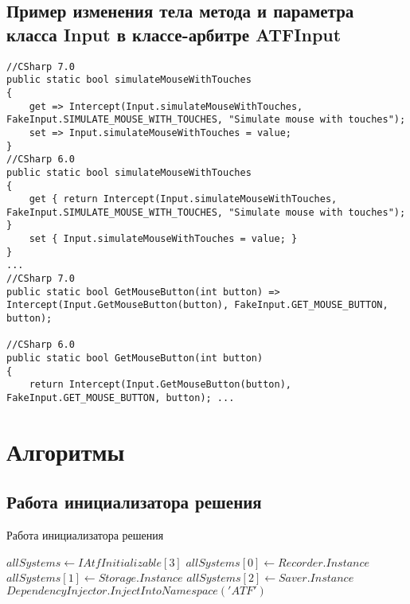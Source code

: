 \section{Пример изменения тела метода и параметра класса Input в классе-арбитре ATFInput}
\begin{lstlisting}[caption={Пример изменения тела метода и параметра класса Input в классе-арбитре ATFInput},label=atf_methods_refactor_example]
//CSharp 7.0
public static bool simulateMouseWithTouches
{
	get => Intercept(Input.simulateMouseWithTouches, 	FakeInput.SIMULATE_MOUSE_WITH_TOUCHES, "Simulate mouse with touches");
	set => Input.simulateMouseWithTouches = value;
}
//CSharp 6.0
public static bool simulateMouseWithTouches
{
	get { return Intercept(Input.simulateMouseWithTouches, 	FakeInput.SIMULATE_MOUSE_WITH_TOUCHES, "Simulate mouse with touches"); }
	set { Input.simulateMouseWithTouches = value; }
}
...
//CSharp 7.0
public static bool GetMouseButton(int button) => Intercept(Input.GetMouseButton(button), FakeInput.GET_MOUSE_BUTTON, button);

//CSharp 6.0
public static bool GetMouseButton(int button)
{
	return Intercept(Input.GetMouseButton(button), FakeInput.GET_MOUSE_BUTTON, button); ...
\end{lstlisting}
\chapter{Алгоритмы}
\section{Работа инициализатора решения}
\begin{algorithm}
	\caption{Работа инициализатора решения}\label{alg:initializer}
	\begin{algorithmic}
		\State $allSystems \gets IAtfInitializable[3]$
		\State $allSystems[0] \gets Recorder.Instance$
		\State $allSystems[1] \gets Storage.Instance$
		\State $allSystems[2] \gets Saver.Instance$
		  \EndFor
		\State $DependencyInjector.InjectIntoNamespace('ATF')$
	\end{algorithmic}
\end{algorithm}
\newpage
